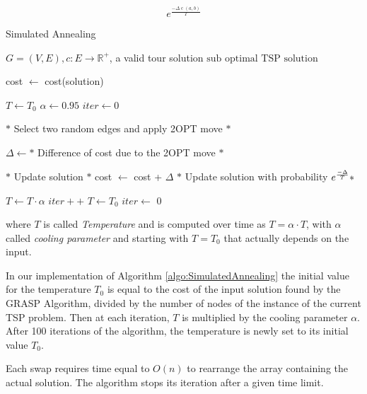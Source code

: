 \begin{equation*}
    e^{\frac{-\Delta \operatorname{c}(a,b)}{T}}
\end{equation*}

\begin{algorithm}[!h]
    \caption{Simulated Annealing}\label{algo:SimulatedAnnealing}
    \begin{algorithmic}[1]
    \Require $G = (V,E), c:E \to \mathbb{R}^+$, a valid tour solution
    \Ensure $\text{sub optimal TSP solution}$

    \State cost $\gets$ cost(solution)

    \State $T \gets   T_0 $
    \State $ \alpha \gets  0.95 $
    \State $ iter \gets  0 $
   




    

    \State $*$ Select two random edges and apply 2OPT move $*$

    
    \State $\Delta \gets *$ Difference of cost due to the 2OPT move $*$  
    
    
    \State $*$ Update solution $*$
    \State cost $\gets$ cost + $\Delta$
    \Else 
    \State $*$ Update solution with probability $ e^{-\Delta \over T}*$

    \EndIf

    \State $T \gets T \cdot \alpha$
    \State $iter++ $
    \State $T \gets   T_0$
    \State $iter \gets  $ 0
    \EndIf
    

    \EndWhile

    \end{algorithmic}
\end{algorithm}

where $T$ is called \textit{Temperature} and is computed over time as $T = \alpha \cdot T$, with $\alpha$ called \textit{cooling parameter} and starting with $T = T_0$ that actually depends on the input.

In our implementation of Algorithm \ref{algo:SimulatedAnnealing} the initial value for the temperature $T_0$ is equal to the cost of the input solution found by the GRASP Algorithm, divided by the number of nodes of the instance of the current TSP problem. Then at each iteration, $T$ is multiplied by the cooling parameter $\alpha$. After 100 iterations of the algorithm, the temperature is newly set to its initial value $T_0$.

Each swap requires time equal to $O(n)$ to rearrange the array containing the actual solution.
The algorithm stops its iteration after a given time limit.

